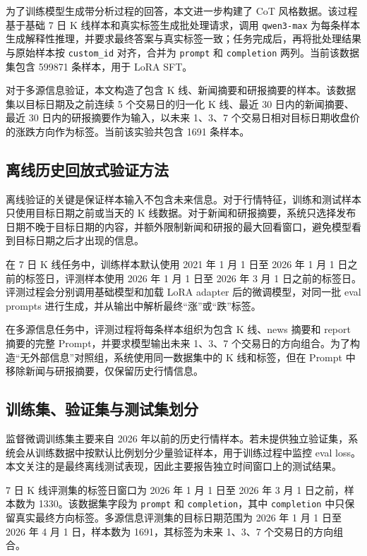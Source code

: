 为了训练模型生成带分析过程的回答，本文进一步构建了 CoT 风格数据。该过程基于基础 7 日 K 线样本和真实标签生成批处理请求，调用 \texttt{qwen3-max} 为每条样本生成解释性推理，并要求最终答案与真实标签一致；任务完成后，再将批处理结果与原始样本按 \texttt{custom\_id} 对齐，合并为 \texttt{prompt} 和 \texttt{completion} 两列。当前该数据集包含 599871 条样本，用于 LoRA SFT。

对于多源信息验证，本文构造了包含 K 线、新闻摘要和研报摘要的样本。该数据集以目标日期及之前连续 5 个交易日的归一化 K 线、最近 30 日内的新闻摘要、最近 30 日内的研报摘要作为输入，以未来 1、3、7 个交易日相对目标日期收盘价的涨跌方向作为标签。当前该实验共包含 1691 条样本。

\subsection{离线历史回放式验证方法}

离线验证的关键是保证样本输入不包含未来信息。对于行情特征，训练和测试样本只使用目标日期之前或当天的 K 线数据。对于新闻和研报摘要，系统只选择发布日期不晚于目标日期的内容，并额外限制新闻和研报的最大回看窗口，避免模型看到目标日期之后才出现的信息。

在 7 日 K 线任务中，训练样本默认使用 2021 年 1 月 1 日至 2026 年 1 月 1 日之前的标签日，评测样本使用 2026 年 1 月 1 日至 2026 年 3 月 1 日之前的标签日。评测过程会分别调用基础模型和加载 LoRA adapter 后的微调模型，对同一批 eval prompts 进行生成，并从输出中解析最终“涨”或“跌”标签。

在多源信息任务中，评测过程将每条样本组织为包含 K 线、news 摘要和 report 摘要的完整 Prompt，并要求模型输出未来 1、3、7 个交易日的方向组合。为了构造“无外部信息”对照组，系统使用同一数据集中的 K 线和标签，但在 Prompt 中移除新闻与研报摘要，仅保留历史行情信息。

\subsection{训练集、验证集与测试集划分}

监督微调训练集主要来自 2026 年以前的历史行情样本。若未提供独立验证集，系统会从训练数据中按默认比例划分少量验证样本，用于训练过程中监控 eval loss。本文关注的是最终离线测试表现，因此主要报告独立时间窗口上的测试结果。

7 日 K 线评测集的标签日窗口为 2026 年 1 月 1 日至 2026 年 3 月 1 日之前，样本数为 1330。该数据集字段为 \texttt{prompt} 和 \texttt{completion}，其中 \texttt{completion} 中只保留真实最终方向标签。多源信息评测集的目标日期范围为 2026 年 1 月 1 日至 2026 年 4 月 1 日，样本数为 1691，其标签为未来 1、3、7 个交易日的方向组合。

